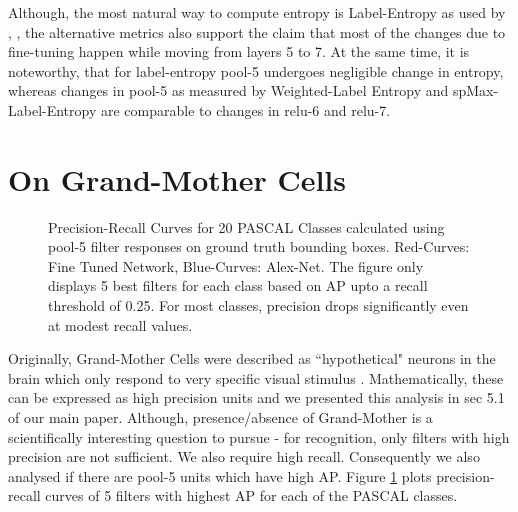 \documentclass[runningheads]{llncs}
\begin{document}
Although, the most natural way to compute entropy is Label-Entropy as used by \cite{Breiman}, \cite{AmitGeman}, the alternative metrics also support the claim that most of the changes due to fine-tuning happen while moving from layers 5 to 7. At the same time, it is noteworthy, that for label-entropy pool-5 undergoes negligible change in entropy, whereas changes in pool-5 as measured by Weighted-Label Entropy and spMax-Label-Entropy are comparable to changes in relu-6 and relu-7.

\section{On Grand-Mother Cells}
\begin{figure}[t!]
\centering
{}
\caption{Precision-Recall Curves for 20 PASCAL Classes calculated using pool-5 filter responses on ground truth bounding boxes. Red-Curves: Fine Tuned Network, Blue-Curves: Alex-Net. The figure only displays 5 best filters for each class based on AP  upto a recall threshold of 0.25. For most classes, precision drops significantly even at modest recall values.}
\label{fig:ap}
\end{figure}

Originally, Grand-Mother Cells were described as ``hypothetical" neurons in the brain which only respond to very specific visual stimulus \cite{Barlow} \cite{Grandmother}. Mathematically, these can be expressed as high precision units and we presented this analysis in sec 5.1 of our main paper. Although, presence/absence of Grand-Mother is a scientifically  interesting question to pursue - for recognition, only filters with high precision are not sufficient. We also require high recall. Consequently we also analysed if there are pool-5 units which have high AP. Figure \ref{fig:ap} plots precision-recall curves of 5 filters with highest AP for each of the PASCAL classes.
\end{document}
